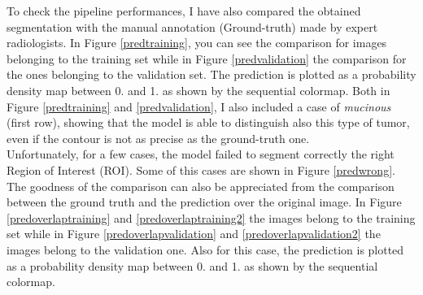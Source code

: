 \documentclass{standalone}
\begin{document}
To check the pipeline performances, I have also compared the obtained segmentation with the manual annotation (Ground-truth) made by expert radiologists.
In Figure \ref{predtraining}, you can see the comparison for images belonging to the training set while in Figure \ref{predvalidation} the comparison for the ones belonging to the validation set.
The prediction is plotted as a probability density map between 0. and 1. as shown by the sequential colormap.
Both in Figure \ref{predtraining} and \ref{predvalidation}, I also included a case of \textit{mucinous} (first row), showing that the model is able to distinguish also this type of tumor, even if the contour is not as precise as the ground-truth one.
\\
Unfortunately, for a few cases, the model failed to segment correctly the right Region of Interest (ROI).
Some of this cases are shown in Figure \ref{predwrong}.
\\
The goodness of the comparison can also be appreciated from the comparison between the ground truth and the prediction over the original image.
In Figure \ref{predoverlaptraining} and \ref{predoverlaptraining2} the images belong to the training set while in Figure \ref{predoverlapvalidation} and \ref{predoverlapvalidation2} the images belong to the validation one.
Also for this case, the prediction is plotted as a probability density map between 0. and 1. as shown by the sequential colormap.
\end{document}

